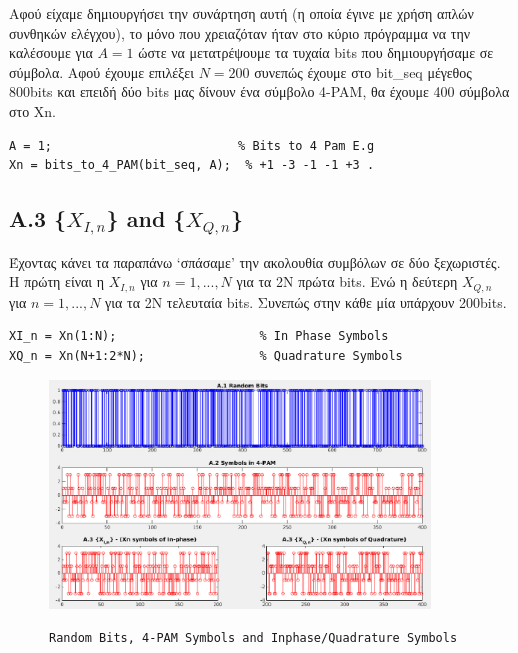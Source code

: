 \documentclass[11pt]{article}
\begin{document}
    \par \noindent
    Αφού είχαμε δημιουργήσει την συνάρτηση αυτή (η οποία έγινε με χρήση απλών συνθηκών ελέγχου), το μόνο που χρειαζόταν ήταν στο κύριο πρόγραμμα να την καλέσουμε για $Α=1$ ώστε να μετατρέψουμε τα τυχαία bits που δημιουργήσαμε σε σύμβολα. 
    Αφού έχουμε επιλέξει $Ν=200$ συνεπώς έχουμε στο bit\_seq μέγεθος 800bits και επειδή δύο bits μας δίνουν ένα σύμβολο 4-PAM, θα έχουμε 400 σύμβολα στο Xn.
    
    \begin{lstlisting}[caption = {A.2 \texttt{Convert bits to symbols}}]
% A.2
A = 1;                          % Bits to 4 Pam E.g
Xn = bits_to_4_PAM(bit_seq, A);  % +1 -3 -1 -1 +3 . 
    \end{lstlisting}
    
    \subsection*{A.3 \{$X_{I,n}$\} and \{$X_{Q,n}$\} }
    Έχοντας κάνει τα παραπάνω `σπάσαμε' την ακολουθία συμβόλων σε δύο ξεχωριστές. 
    Η πρώτη είναι η $X_{I,n}$ για $n=1, ..., N$ για τα 2Ν πρώτα bits. 
    Ενώ η δεύτερη $X_{Q,n}$ για $n=1, ..., N$ για τα 2Ν τελευταία bits. 
    Συνεπώς στην κάθε μία υπάρχουν 200bits.
    
    
    \begin{lstlisting}[caption = {A.3 \texttt{Split Symbols}}]
% A.3
XI_n = Xn(1:N);                    % In Phase Symbols
XQ_n = Xn(N+1:2*N);                % Quadrature Symbols
    \end{lstlisting}
    
    
     \begin{figure}[H]
        \centering
        \includegraphics[scale=0.5, width=0.9\textwidth]{img/A1_A3.png} \\
        \caption{\texttt{Random Bits, 4-PAM Symbols and Inphase/Quadrature Symbols}}
    \end{figure}
    
\end{document}
